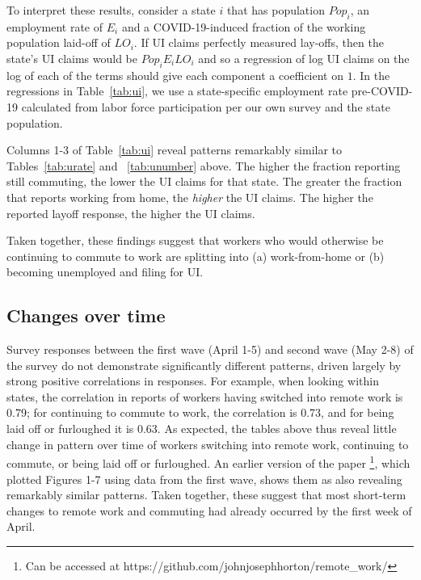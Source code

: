 \documentclass[12pt]{article}
\begin{document}
To interpret these results, consider a state $i$ that has population $Pop_i$, an employment rate of $E_i$ and a COVID-19-induced fraction of the working population laid-off of $LO_i$. If UI claims perfectly measured lay-offs, then the state's UI claims would be $Pop_i E_i LO_i$ and so a regression of log UI claims on the log of each of the terms should give each component a coefficient on $1$. 
In the regressions in Table~\ref{tab:ui}, we use a state-specific employment rate pre-COVID-19 calculated from labor force participation per our own survey and the state population. 

Columns 1-3 of Table~\ref{tab:ui} reveal patterns remarkably similar to Tables~\ref{tab:urate} and ~\ref{tab:unumber} above. The higher the fraction reporting still commuting, the lower the UI claims for that state. The greater the fraction that reports working from home, the \emph{higher} the UI claims. The higher the reported layoff response, the higher the UI claims.



Taken together, these findings suggest that workers who would otherwise be continuing to commute to work are splitting into (a) work-from-home or (b) becoming unemployed and filing for UI.




\subsection{Changes over time} \label{sec:timechanges}

Survey responses between the first wave (April 1-5) and second wave (May 2-8) of the survey do not demonstrate significantly different patterns, driven largely by strong positive correlations in responses. For example, when looking within states, the correlation in reports of workers having switched into remote work is 0.79; for continuing to commute to work, the correlation is 0.73, and for being laid off or furloughed it is 0.63. As expected, the tables above thus reveal little change in pattern over time of workers switching into remote work, continuing to commute, or being laid off or furloughed. An earlier version of the paper \footnote{Can be accessed at https://github.com/johnjosephhorton/remote_work/}, which plotted Figures 1-7 using data from the first wave, shows them as also revealing remarkably similar patterns. Taken together, these suggest that most short-term changes to remote work and commuting had already occurred by the first week of April. 
\end{document}
